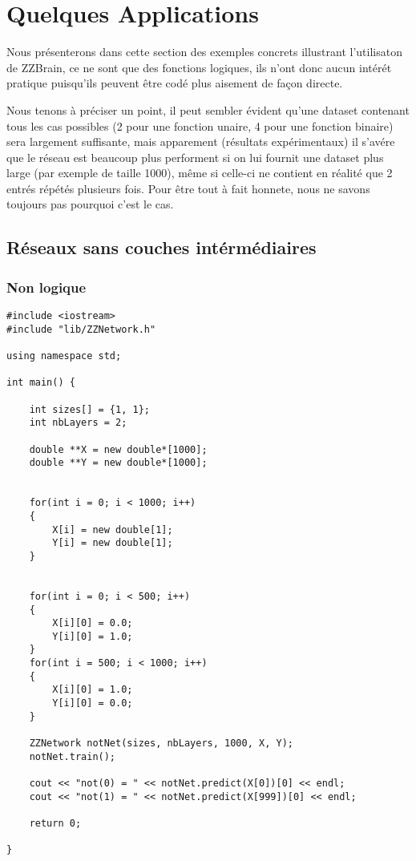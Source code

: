 \section{Quelques Applications}

Nous présenterons dans cette section des exemples concrets illustrant l'utilisaton de ZZBrain, ce ne sont que des fonctions logiques, ils n'ont donc aucun intérét pratique puisqu'ils peuvent être codé plus aisement de façon directe.

Nous tenons à préciser un point, il peut sembler évident qu'une dataset contenant tous les cas possibles (2 pour une fonction unaire, 4 pour une fonction binaire) sera largement suffisante, mais apparement (résultats expérimentaux) il s'avére que le réseau est beaucoup plus performent si on lui fournit une dataset plus large (par exemple de taille 1000), même si celle-ci ne contient en réalité que 2 entrés répétés plusieurs fois.
Pour être tout à fait honnete, nous ne savons toujours pas pourquoi c'est le cas.

\subsection{Réseaux sans couches intérmédiaires}

\subsubsection{Non logique}

\begin{verbatim}
#include <iostream>
#include "lib/ZZNetwork.h"

using namespace std;

int main() {

	int sizes[] = {1, 1};
	int nbLayers = 2;

	double **X = new double*[1000];
	double **Y = new double*[1000];


	for(int i = 0; i < 1000; i++)
	{
		X[i] = new double[1];
		Y[i] = new double[1];
	}


	for(int i = 0; i < 500; i++)
	{
		X[i][0] = 0.0;
		Y[i][0] = 1.0;
	}
	for(int i = 500; i < 1000; i++)
	{
		X[i][0] = 1.0;
		Y[i][0] = 0.0;
	}

	ZZNetwork notNet(sizes, nbLayers, 1000, X, Y);
	notNet.train();

	cout << "not(0) = " << notNet.predict(X[0])[0] << endl;
	cout << "not(1) = " << notNet.predict(X[999])[0] << endl;

    return 0;

}
\end{verbatim}

